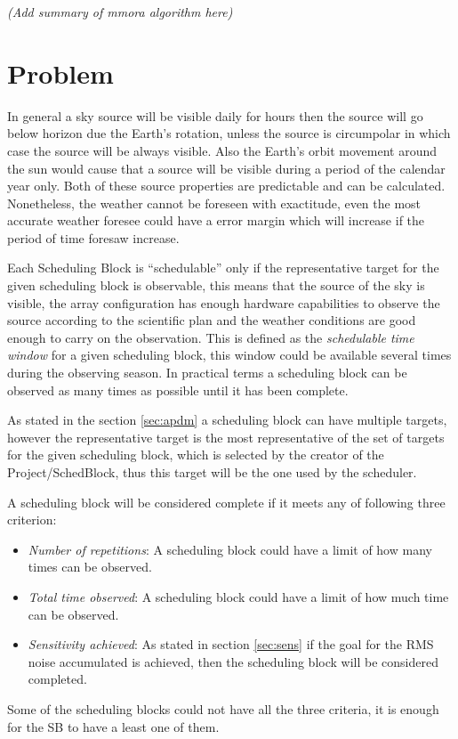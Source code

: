 \documentclass[11pt]{article}
\begin{document}
\textit{(Add summary of mmora algorithm here)}

\newpage
\section{Problem}
In general a sky source will be visible daily for hours then the source will go below horizon due the Earth's rotation, unless the source is circumpolar in which case the source will be always visible. Also the Earth's orbit movement around the sun would cause that a source will be visible during a period of the calendar year only. Both of these source properties are predictable and can be calculated. Nonetheless, the weather cannot be foreseen with exactitude, even the most accurate weather foresee could have a error margin which will increase if the period of time foresaw increase.

Each Scheduling Block is ``schedulable'' only if the representative target for the given scheduling block is observable, this means that the source of the sky is visible, the array configuration has enough hardware capabilities to observe the source according to the scientific plan and the weather conditions are good enough to carry on the observation. This is defined as the \textit{schedulable time window} for a given scheduling block, this window could be available several times during the observing season. In practical terms a scheduling block can be observed as many times as possible until it has been complete.

As stated in the section \ref{sec:apdm} a scheduling block can have multiple targets, however the representative target is the most representative of the set of targets for the given scheduling block, which is selected by the creator of the Project/SchedBlock, thus this target will be the one used by the scheduler.

A scheduling block will be considered complete if it meets any of following three criterion:
\begin{itemize}
	\item \textit{Number of repetitions}: A scheduling block could have a limit of how many times can be observed.
	\item \textit{Total time observed}: A scheduling block could have a limit of how much time can be observed.
	\item \textit{Sensitivity achieved}: As stated in section \ref{sec:sens} if the goal for the RMS noise accumulated is achieved, then the scheduling block will be considered completed.
\end{itemize} 
Some of the scheduling blocks could not have all the three criteria, it is enough for the SB to have a least one of them.
\end{document}
